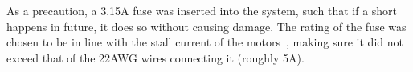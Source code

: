 \documentclass[main.tex]{subfiles}
\begin{document}
	As a precaution, a 3.15A fuse was inserted into the system, such that if a short happens in future, it does so without causing damage. The rating of the fuse was chosen to be in line with the stall current of the motors~\cite{motor}, making sure it did not exceed that of the 22AWG wires connecting it (roughly 5A).




\bib
\end{document}
